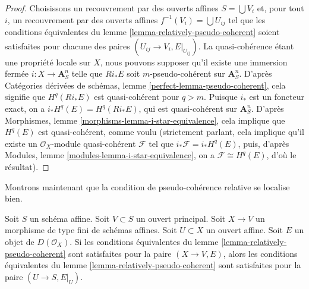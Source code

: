 \begin{proof}
Choisissons un recouvrement par des ouverts affines $S = \bigcup V_i$ et,
pour tout $i$, un recouvrement par des ouverts affines $f^{-1}(V_i) = \bigcup U_{ij}$
tel que les conditions équivalentes du
lemme \ref{lemma-relatively-pseudo-coherent}
soient satisfaites pour chacune des paires $(U_{ij} \to V_i, E|_{U_{ij}})$.
La quasi-cohérence étant une propriété locale sur $X$, nous pouvons supposer
qu'il existe une immersion fermée $i : X \to \mathbf{A}^n_S$
telle que $Ri_*E$ soit $m$-pseudo-cohérent sur $\mathbf{A}^n_S$.
D'après Catégories dérivées de schémas, lemme \ref{perfect-lemma-pseudo-coherent},
cela signifie que $H^q(Ri_*E)$ est quasi-cohérent pour $q > m$.
Puisque $i_*$ est un foncteur exact, on a $i_*H^q(E) = H^q(Ri_*E)$,
qui est quasi-cohérent sur $\mathbf{A}^n_S$.
D'après Morphismes, lemme \ref{morphisms-lemma-i-star-equivalence},
cela implique que $H^q(E)$ est quasi-cohérent, comme voulu
(strictement parlant, cela implique qu'il existe un
$\mathcal{O}_X$-module quasi-cohérent $\mathcal{F}$ tel que
$i_*\mathcal{F} = i_*H^q(E)$, puis, d'après
Modules, lemme \ref{modules-lemma-i-star-equivalence},
on a $\mathcal{F} \cong H^q(E)$, d'où le résultat).
\end{proof}

\noindent
Montrons maintenant que la condition de pseudo-cohérence relative se localise bien.

\begin{lemma}
\label{lemma-localize-relative-pseudo-coherent}
Soit $S$ un schéma affine. Soit $V \subset S$ un ouvert principal.
Soit $X \to V$ un morphisme de type fini de schémas affines.
Soit $U \subset X$ un ouvert affine. Soit $E$ un objet de
$D(\mathcal{O}_X)$. Si les conditions équivalentes du
lemme \ref{lemma-relatively-pseudo-coherent}
sont satisfaites pour la paire $(X \to V, E)$, alors
les conditions équivalentes du
lemme \ref{lemma-relatively-pseudo-coherent}
sont satisfaites pour la paire $(U \to S, E|_U)$.
\end{lemma}

